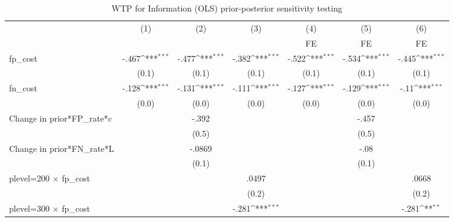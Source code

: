 \begin{table}[htbp]\centering
\def\sym#1{\ifmmode^{#1}\else\(^{#1}\)\fi}
\caption{WTP for Information (OLS) prior-posterior sensitivity testing}
\begin{tabular}{l*{6}{c}}
\hline\hline
                &\multicolumn{1}{c}{(1)}&\multicolumn{1}{c}{(2)}&\multicolumn{1}{c}{(3)}&\multicolumn{1}{c}{(4)}&\multicolumn{1}{c}{(5)}&\multicolumn{1}{c}{(6)}\\
                &\multicolumn{1}{c}{}&\multicolumn{1}{c}{}&\multicolumn{1}{c}{}&\multicolumn{1}{c}{FE}&\multicolumn{1}{c}{FE}&\multicolumn{1}{c}{FE}\\
\hline
fp\_cost         &    -.467\sym{***}&    -.477\sym{***}&    -.382\sym{***}&    -.522\sym{***}&    -.534\sym{***}&    -.445\sym{***}\\
                &    (0.1)         &    (0.1)         &    (0.1)         &    (0.1)         &    (0.1)         &    (0.1)         \\
fn\_cost         &    -.128\sym{***}&    -.131\sym{***}&    -.111\sym{***}&    -.127\sym{***}&    -.129\sym{***}&     -.11\sym{***}\\
                &    (0.0)         &    (0.0)         &    (0.0)         &    (0.0)         &    (0.0)         &    (0.0)         \\
Change in prior*FP\_rate*c&                  &    -.392         &                  &                  &    -.457         &                  \\
                &                  &    (0.5)         &                  &                  &    (0.5)         &                  \\
Change in prior*FN\_rate*L&                  &   -.0869         &                  &                  &     -.08         &                  \\
                &                  &    (0.1)         &                  &                  &    (0.1)         &                  \\
plevel=200 $\times$ fp\_cost&                  &                  &    .0497         &                  &                  &    .0668         \\
                &                  &                  &    (0.2)         &                  &                  &    (0.2)         \\
plevel=300 $\times$ fp\_cost&                  &                  &    -.281\sym{***}&                  &                  &    -.281\sym{**} \\

\end{tabular}
\end{table}

